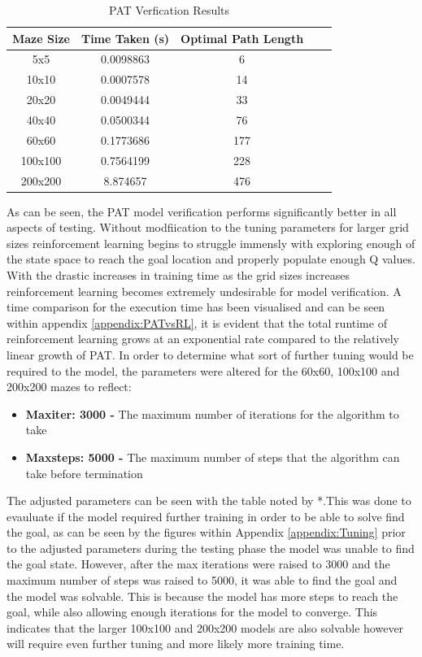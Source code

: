 \documentclass[twoside, 12pt, a4paper]{article}
\begin{document}
\begin{table}[ht]
\begin {center}
\begin{tabular}{ | c | c | c | c | c |}
\hline
 \textbf{Maze Size} & \textbf{ Time Taken (s)} &  \textbf{Optimal Path Length}  \\
\hline
5x5 		& 0.0098863	& 6	 \\
10x10 	& 0.0007578	& 14	 \\
20x20 	& 0.0049444 & 33	 \\
40x40		& 0.0500344	& 76	 \\
60x60 	& 0.1773686	& 177	 \\
100x100	& 0.7564199	& 228	 \\
200x200	& 8.874657	& 476	 \\
\hline
\end {tabular}
\caption{\label{tab:table-name}PAT Verfication Results}
\end {center}
\end{table}
\newpage
As can be seen, the PAT model verification performs significantly better in all aspects of testing. Without modfiication to the tuning parameters for larger grid sizes reinforcement learning begins to struggle immensly with exploring enough of the state space to reach the goal location and properly populate enough Q values. With the drastic increases in training time as the grid sizes increases reinforcement learning becomes extremely undesirable for model verification. A time comparison for the execution time has been visualised and can be seen within appendix \ref{appendix:PATvsRL}, it is evident that the total runtime of reinforcement learning grows at an exponential rate compared to the relatively linear growth of PAT.  In order to determine what sort of further tuning would be required to the model, the parameters were altered for the 60x60, 100x100 and 200x200 mazes to reflect:
\begin{itemize}
\item \textbf{Maxiter: 3000 -} The maximum number of iterations for the algorithm to take
\item \textbf{Maxsteps: 5000 -} The maximum number of steps that the algorithm can take before termination
\end{itemize}
The adjusted parameters can be seen with the table noted by *.This was done to evauluate if the model required further training in order to be able to solve find the goal, as can be seen by the figures within Appendix \ref{appendix:Tuning} prior to the adjusted parameters during the testing phase the model was unable to find the goal state. However, after the max iterations were raised to 3000 and the maximum number of steps was raised to 5000,  it was able to find the goal and the model was solvable. This is because the model has more steps to reach the goal, while also allowing enough iterations for the model to converge. This indicates that the larger 100x100  and 200x200 models are also solvable however will require even further tuning and more likely more training time. \\
\end{document}
